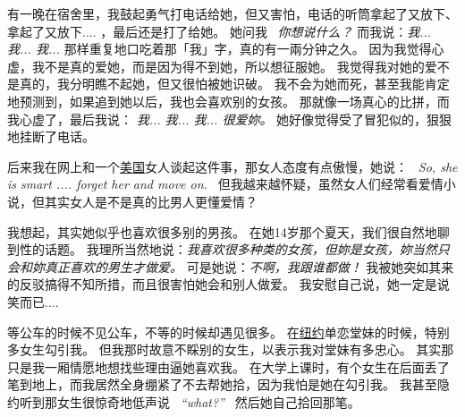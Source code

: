 \documentclass[12pt]{report}
\newcommand{\speechEn}[1]{\textrm{\textit{\ #1\ }}}
\newcommand{\speechCn}[1]{\textrm{\textit{\textcolor{Speech}{#1}}}}
\begin{document}
{有一晚在宿舍里，我鼓起勇气打电话给她，但又害怕，电话的听筒拿起了又放下、拿起了又放下.... ，最后还是打了给她。 她问我 \ \speechCn{你想说什么？}   而我说：\speechCn{我... 我... 我... } 那样重复地口吃着那「我」字，真的有一兩分钟之久。  因为我觉得心虚，我不是真的爱她，而是因为得不到她，所以想征服她。  我觉得我对她的爱不是真的，我分明瞧不起她，但又很怕被她识破。  我不会为她而死，甚至我能肯定地预测到，如果追到她以后，我也会喜欢别的女孩。  那就像一场真心的比拼，而我心虚了，最后我说： \speechCn{我... 我... 我... 很爱妳。}  她好像觉得受了冒犯似的，狠狠地挂断了电话。

后来我在网上和一个\uline{美国}女人谈起这件事，那女人态度有点傲慢，她说： \speechEn{So, she is smart .... forget her and move on.}  但我越来越怀疑，虽然女人们经常看爱情小说，但其实女人是不是真的比男人更懂爱情？

我想起，其实她似乎也喜欢很多别的男孩。 在她14岁那个夏天，我们很自然地聊到性的话题。  我理所当然地说：\speechCn{我喜欢很多种类的女孩，但妳是女孩，妳当然只会和妳真正喜欢的男生才做爱。}  可是她说：\speechCn{不啊，我跟谁都做！}  我被她突如其来的反驳搞得不知所措，而且很害怕她会和别人做爱。 我安慰自己说，她一定是说笑而已....

等公车的时候不见公车，不等的时候却遇见很多。  在\uline{纽约}单恋堂妹的时候，特别多女生勾引我。 但我那时故意不睬别的女生，以表示我对堂妹有多忠心。  其实那只是我一厢情愿地想找些理由逼她喜欢我。  在大学上课时，有个女生在后面丢了笔到地上，而我居然全身绷紧了不去帮她拾，因为我怕是她在勾引我。  我甚至隐约听到那女生很惊奇地低声说 \speechEn{``what?''} 然后她自己拾回那笔。
}
\end{document}
